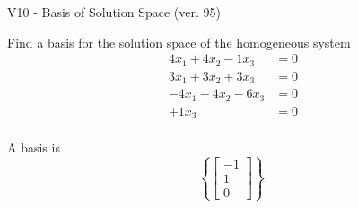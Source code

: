 \begin{exercise}
  \begin{exerciseTitle}V10 - Basis of Solution Space (ver. 95)\end{exerciseTitle}
  \begin{exerciseStatement}
    Find a basis for the solution space of the homogeneous system 
\begin{align*}
 4 x_ 1 + 4 x_ 2 -1 x_ 3 &= 0  \\ 
  3 x_ 1 + 3 x_ 2 + 3 x_ 3 &= 0  \\ 
  -4 x_ 1 -4 x_ 2 -6 x_ 3 &= 0  \\ 
  + 1 x_ 3 &= 0  \\ 
 \end{align*}


 
  \end{exerciseStatement}

  \begin{exerciseAnswer}
   A basis is   
\[\left\{\left[\begin{array}{c}
-1 \\
1 \\
0
\end{array}\right]\right\}.\]

  


  \end{exerciseAnswer}
\end{exercise}
